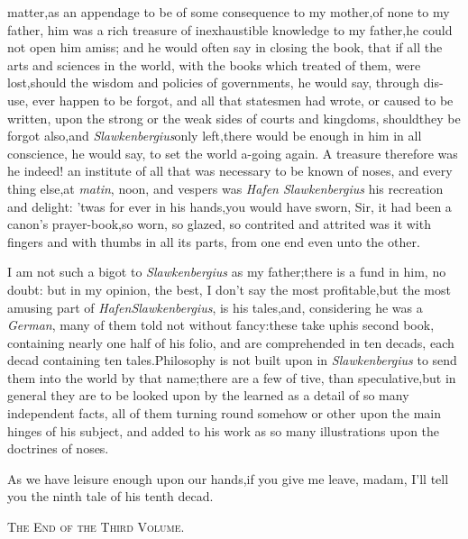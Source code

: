 \documentclass{article}
\begin{document}
 matter,\tsh as an appendage to\break
{}\break
be of some consequence to my
mother,\tsk of none to my father, \break
him was a rich treasure of inexhaustible\break
knowledge to my father,\tsk he could not 
open \enlargethispage\baselineskip
him amiss; and he would often say in closing the book,
that if all the arts and sciences in the world, with the
books which treated of them, were lost,\tsk\break should the
wisdom and policies of governments, he would say, through
dis-\break use, ever happen to be forgot, and all that statesmen had
wrote, or caused to be written, upon the strong or the weak
sides of courts and kingdoms, should\break they be forgot
also,\tsk and \textit{Slawkenbergius}\break only left,\tsk there
would be enough in him in all conscience, he would say, to
set the world a-going again. A treasure therefore was he
indeed! an institute of all that was necessary to be known
of noses, and every thing else,\tsk at \textit{matin}, noon,
and vespers was \textit{Hafen Slawkenbergius} his recreation
and delight: ’twas for ever in his hands,\tsh you would have
sworn, Sir, it had been a canon’s prayer-book,\tsk so worn,
so glazed, so contrited and attrited was it with fingers
and with thumbs in all its parts, from one end even unto the
other.

I am not such a bigot to \textit{Slawkenber\-gius} as my
father;\tsk there is a fund in him, no doubt: but in my
opinion, the best, I don’t say the most profitable,\break but
the most amusing part of \textit{Hafen}\break\textit{Slawkenbergius}, is
his tales,\tsh and, considering he was a \textit{German},
many of them told not without fancy:\tsh these take up\break his
second book, containing nearly one half of his folio, and are
comprehended in ten decads, each decad containing ten
tales.\tsh Philosophy is not built upon
in \textit{Slawkenbergius} to send them into the 
world by that name;\tsk there are a few of 
tive, than speculative,\tsk but in general
they are to be looked upon by the learned as a detail of so many
independent facts, all of them turning round somehow or other upon
the main hinges of his subject, and added to his work as so many
illustrations upon the doctrines of noses.

As we have leisure enough upon our hands,\tsh if you
give me leave, madam, I’ll tell you the ninth tale of his
tenth decad.

\vskip 32pt

\centerline{\textsc{The End of the Third Volume}.}
\end{document}
